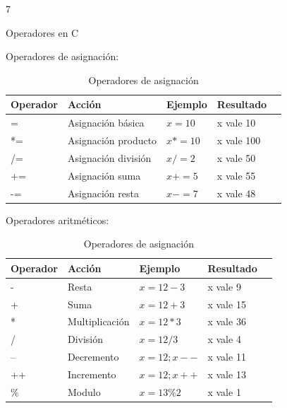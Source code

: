 7\documentclass[xcolor=pdftex,table,11pt]{beamer}
\begin{document}
\begin{frame}[allowframebreaks] {Operadores en C}

Operadores de asignación:

\begin{table}
\begin{tabular}{p{15mm} | p{35mm} | p{22mm} | p{22mm} | p{22mm} }
Operador & Acción & Ejemplo & Resultado\\
\hline \hline 
= & 	Asignación básica  		  & $x=10$ 	 	& x vale 10\\
*= 	& 	Asignación producto       & $x*=10$ 	& x vale 100 \\
/= 	& 	Asignación división       & $x/=2$      & x vale 50 \\
+= 		& Asignación suma         & $x+=5$  	& x vale 55\\
-= 			& 	Asignación resta  & $x-=7$  	& x vale 48\\ 

\end{tabular}
\caption{Operadores de asignación}
\end{table}



\newpage
Operadores aritméticos:

\begin{table}
\begin{tabular}{p{15mm} | p{35mm} | p{22mm} | p{22mm} | p{22mm} }
Operador & Acción & Ejemplo & Resultado\\
\hline \hline  
- 	& 	Resta & $x=12 - 3 $ & x vale 9\\
+ 	& 	Suma & $x=12 + 3 $ & x vale 15\\
* 	& 	Multiplicación &  $x=12 * 3 $ & x vale 36\\
/ 	& 	División &  $x=12 / 3 $ & x vale 4\\
--	& 	Decremento &  $x=12; x-- $ & x vale 11\\
++	& 	Incremento &  $x=12; x++ $ & x vale 13\\
\%	& 	Modulo &  $x=13 \% 2 $ & x vale 1\\
\end{tabular}
\caption{Operadores de asignación}
\end{table}



\end{frame}
\end{document}
